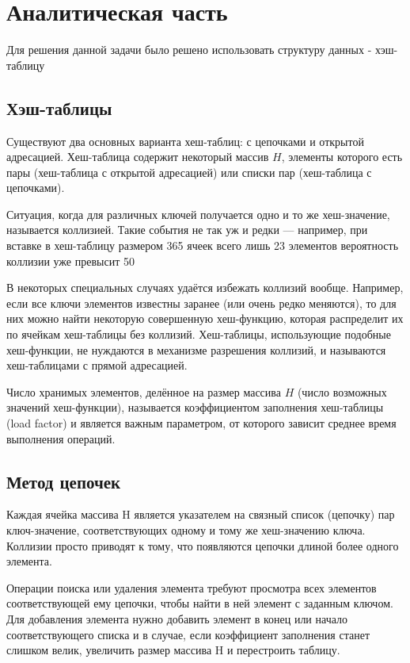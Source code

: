 \documentclass[12pt]{report}
\begin{document}
\chapter{Аналитическая часть}
Для решения данной задачи было решено использовать структуру данных - хэш-таблицу

\section{Хэш-таблицы} 
Существуют два основных варианта хеш-таблиц: с цепочками и открытой адресацией. Хеш-таблица содержит некоторый массив $H$, элементы которого есть пары (хеш-таблица с открытой адресацией) или списки пар (хеш-таблица с цепочками).

Ситуация, когда для различных ключей получается одно и то же хеш-значение, называется коллизией. Такие события не так уж и редки — например, при вставке в хеш-таблицу размером 365 ячеек всего лишь 23 элементов вероятность коллизии уже превысит 50 %

В некоторых специальных случаях удаётся избежать коллизий вообще. Например, если все ключи элементов известны заранее (или очень редко меняются), то для них можно найти некоторую совершенную хеш-функцию, которая распределит их по ячейкам хеш-таблицы без коллизий. Хеш-таблицы, использующие подобные хеш-функции, не нуждаются в механизме разрешения коллизий, и называются хеш-таблицами с прямой адресацией.

Число хранимых элементов, делённое на размер массива $H$ (число возможных значений хеш-функции), называется коэффициентом заполнения хеш-таблицы (load factor) и является важным параметром, от которого зависит среднее время выполнения операций. 
\section{Метод цепочек}
Каждая ячейка массива H является указателем на связный список (цепочку) пар ключ-значение, соответствующих одному и тому же хеш-значению ключа. Коллизии просто приводят к тому, что появляются цепочки длиной более одного элемента.

Операции поиска или удаления элемента требуют просмотра всех элементов соответствующей ему цепочки, чтобы найти в ней элемент с заданным ключом. Для добавления элемента нужно добавить элемент в конец или начало соответствующего списка и в случае, если коэффициент заполнения станет слишком велик, увеличить размер массива H и перестроить таблицу.
\end{document}
